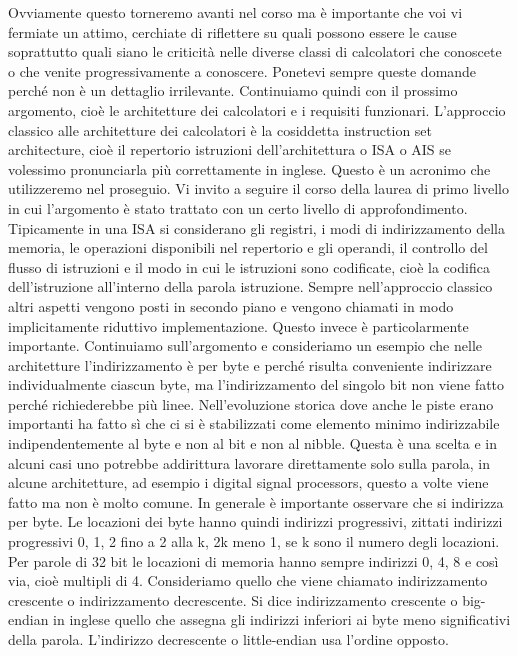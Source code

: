 Ovviamente questo torneremo avanti nel corso ma è importante che voi vi fermiate un attimo, cerchiate di riflettere su quali possono essere le cause soprattutto quali siano le criticità nelle diverse classi di calcolatori che conoscete o che venite progressivamente a conoscere.
Ponetevi sempre queste domande perché non è un dettaglio irrilevante.
Continuiamo quindi con il prossimo argomento, cioè le architetture dei calcolatori e i requisiti funzionari.
L'approccio classico alle architetture dei calcolatori è la cosiddetta instruction set architecture, cioè il repertorio istruzioni dell'architettura o ISA o AIS se volessimo pronunciarla più correttamente in inglese.
Questo è un acronimo che utilizzeremo nel proseguio.
Vi invito a seguire il corso della laurea di primo livello in cui l'argomento è stato trattato con un certo livello di approfondimento.
Tipicamente in una ISA si considerano gli registri, i modi di indirizzamento della memoria, le operazioni disponibili nel repertorio e gli operandi, il controllo del flusso di istruzioni e il modo in cui le istruzioni sono codificate, cioè la codifica dell'istruzione all'interno della parola istruzione.
Sempre nell'approccio classico altri aspetti vengono posti in secondo piano e vengono chiamati in modo implicitamente riduttivo implementazione.
Questo invece è particolarmente importante.
Continuiamo sull'argomento e consideriamo un esempio che nelle architetture l'indirizzamento è per byte e perché risulta conveniente indirizzare individualmente ciascun byte, ma l'indirizzamento del singolo bit non viene fatto perché richiederebbe più linee.
Nell'evoluzione storica dove anche le piste erano importanti ha fatto sì che ci si è stabilizzati come elemento minimo indirizzabile indipendentemente al byte e non al bit e non al nibble.
Questa è una scelta e in alcuni casi uno potrebbe addirittura lavorare direttamente solo sulla parola, in alcune architetture, ad esempio i digital signal processors, questo a volte viene fatto ma non è molto comune.
In generale è importante osservare che si indirizza per byte.
Le locazioni dei byte hanno quindi indirizzi progressivi, zittati indirizzi progressivi 0, 1, 2 fino a 2 alla k, 2k meno 1, se k sono il numero degli locazioni.
Per parole di 32 bit le locazioni di memoria hanno sempre indirizzi 0, 4, 8 e così via, cioè multipli di 4.
Consideriamo quello che viene chiamato indirizzamento crescente o indirizzamento decrescente.
Si dice indirizzamento crescente o big-endian in inglese quello che assegna gli indirizzi inferiori ai byte meno significativi della parola.
L'indirizzo decrescente o little-endian usa l'ordine opposto.
